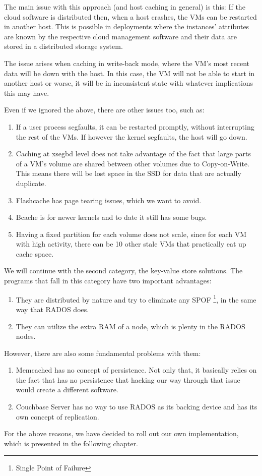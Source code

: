 The main issue with this approach (and host caching in general) is this: If the 
cloud software is distributed then, when a host crashes, the VMs can be 
restarted in another host. This is possible in deployments where the instances' 
attributes are known by the respective cloud management software and their data 
are stored in a distributed storage system. 

The issue arises when caching in write-back mode, where the VM's most recent 
data will be down with the host. In this case, the VM will not be able to start 
in another host or worse, it will be in inconsistent state with whatever 
implications this may have.

Even if we ignored the above, there are other issues too, such as:

\begin{enumerate}
	\item If a user process segfaults, it can be restarted promptly, 
		without interrupting the rest of the VMs. If however the kernel 
		segfaults, the host will go down.
	\item Caching at xsegbd level does not take advantage of the fact that 
		large parts of a VM's volume are shared between other volumes 
		due to Copy-on-Write. This means there will be lost space in 
		the SSD for data that are actually duplicate.
	\item Flashcache has page tearing issues, which we want to avoid.
	\item Bcache is for newer kernels and to date it still has some bugs.
	\item Having a fixed partition for each volume does not scale, since 
		for each VM with high activity, there can be 10 other stale VMs 
		that practically eat up cache space.
\end{enumerate}

We will continue with the second category, the key-value store solutions. The 
programs that fall in this category have two important advantages:

\begin{enumerate}
	\item They are distributed by nature and try to eliminate any SPOF
		\footnote{Single Point of Failure}, in the same way that RADOS does.
	\item They can utilize the extra RAM of a node, which is plenty in the 
		RADOS nodes.
\end{enumerate}

However, there are also some fundamental problems with them:

\begin{enumerate}
	\item Memcached has no concept of persistence. Not only that, it basically 
		relies on the fact that has no persistence that hacking our way through 
		that issue would create a different software.
	\item Couchbase Server has no way to use RADOS as its backing device and 
		has its own concept of replication.
\end{enumerate}

For the above reasons, we have decided to roll out our own implementation, 
which is presented in the following chapter.
